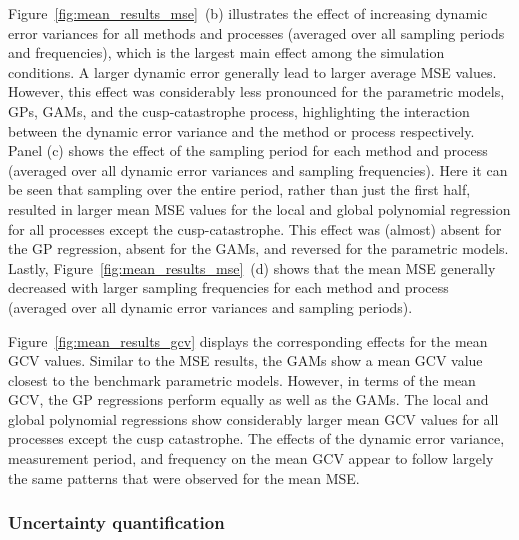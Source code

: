 \documentclass[man, floatsintext]{apa7}
\begin{document}
Figure~\ref{fig:mean_results_mse}~(b) illustrates the effect of increasing
dynamic error variances for all methods and processes (averaged over all
sampling periods and frequencies), which is the largest main effect among the
simulation conditions. A larger dynamic error generally lead to larger average
MSE values. However, this effect was considerably less pronounced for the
parametric models, GPs, GAMs, and the cusp-catastrophe process, highlighting
the interaction between the dynamic error variance and the method or process
respectively. Panel (c) shows the effect of the sampling period for each method
and process (averaged over all dynamic error variances and sampling
frequencies). Here it can be seen that sampling over the entire period, rather
than just the first half, resulted in larger mean MSE values for the local and
global polynomial regression for all processes except the
cusp-catastrophe. This effect was (almost) absent for the GP regression,
absent for the GAMs, and reversed for the parametric models. Lastly,
Figure~\ref{fig:mean_results_mse}~(d) shows that the mean MSE generally
decreased with larger sampling frequencies for each method and process
(averaged over all dynamic error variances and sampling periods).

Figure~\ref{fig:mean_results_gcv} displays the corresponding effects for the
mean GCV values. Similar to the MSE results, the GAMs show a mean GCV value
closest to the benchmark parametric models. However, in terms of the mean GCV,
the GP regressions perform equally as well as the GAMs. The local and global
polynomial regressions show considerably larger mean GCV values for all
processes except the cusp catastrophe. The effects of the dynamic error
variance, measurement period, and frequency on the mean GCV appear to follow
largely the same patterns that were observed for the mean MSE\@.

\begin{sidewaysfigure*}[htbp]
  \caption{Mean GCV effects across all processes, analysis
    methods, and simulation conditions}
  \label{fig:mean_results_gcv}
\end{sidewaysfigure*}

\subsubsection{Uncertainty quantification}
\end{document}

